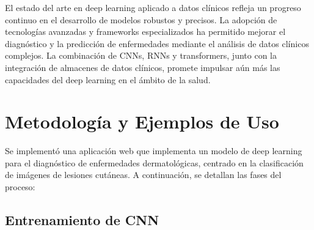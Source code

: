 \documentclass{article}
\begin{document}
El estado del arte en deep learning aplicado a datos clínicos refleja un progreso continuo en el desarrollo de modelos robustos y precisos. La adopción de tecnologías avanzadas y frameworks especializados ha permitido mejorar el diagnóstico y la predicción de enfermedades mediante el análisis de datos clínicos complejos. La combinación de CNNs, RNNs y transformers, junto con la integración de almacenes de datos clínicos, promete impulsar aún más las capacidades del deep learning en el ámbito de la salud.
\\

\section{Metodología y Ejemplos de Uso}
\label{sec:metodologia_ejemplos}

Se implementó una aplicación web que implementa un modelo de deep learning para el diagnóstico de enfermedades dermatológicas, centrado en la clasificación de imágenes de lesiones cutáneas. A continuación, se detallan las fases del proceso:


\subsection{Entrenamiento de CNN}
\end{document}
